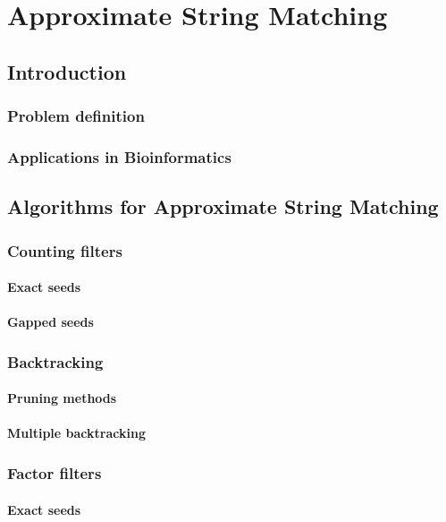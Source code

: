 \part{Approximate String Matching}

\chapter{Introduction}
\section{Problem definition}
\section{Applications in Bioinformatics}

\chapter{Algorithms for Approximate String Matching}
\section{Counting filters}
\subsection{Exact seeds}
\subsection{Gapped seeds}
\section{Backtracking}
\subsection{Pruning methods}
\subsection{Multiple backtracking}
\section{Factor filters}
\subsection{Exact seeds}
